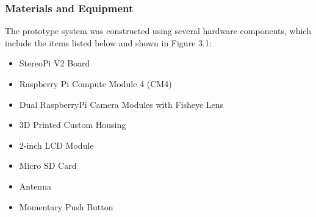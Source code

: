 \subsubsection{Materials and Equipment}


The prototype system was constructed using several hardware components, which include the items listed below and shown in Figure 3.1:
\begin{itemize}
	\item StereoPi V2 Board
	\item Raspberry Pi Compute Module 4 (CM4)
	\item Dual RaspberryPi Camera Modules with Fisheye Lens
	\item 3D Printed Custom Housing
	\item 2-inch LCD Module
	\item Micro SD Card
	\item Antenna
	\item Momentary Push Button
\end{itemize}

